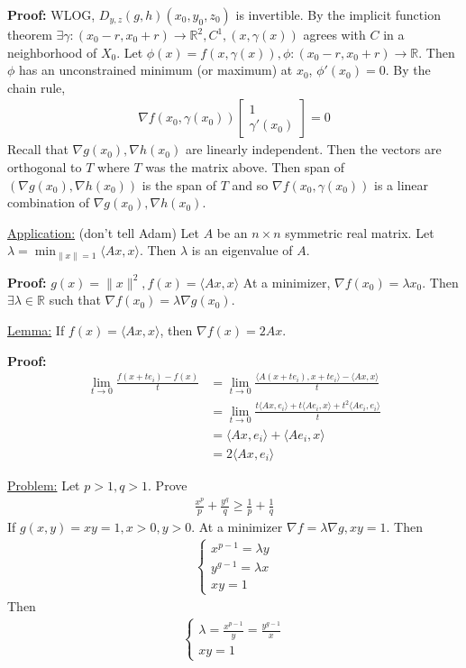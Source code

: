 \documentclass{article}
\newcommand*{\iprod}[1]{\langle #1 \rangle}
\newcommand*{\rr}{\mathbb{R}}%
\begin{document}
\textbf{Proof:} WLOG, $D_{y,z}(g,h)(x_0,y_0,z_0)$ is invertible. By the implicit function theorem $\exists \gamma:(x_0-r,x_0+r)\to \rr^2, C^1, (x,\gamma(x))$ agrees with $C$ in a neighborhood of $X_0$. Let $\phi(x)=f(x,\gamma(x)), \phi:(x_0-r,x_0+r)\to \rr$. Then $\phi$ has an unconstrained minimum (or maximum) at $x_0$, $\phi'(x_0)=0$. By the chain rule, \begin{align*}
    \nabla f(x_0,\gamma(x_0))\begin{bmatrix}
        1\\
        \gamma'(x_0)
    \end{bmatrix}=0
\end{align*}Recall that $\nabla g(x_0),\nabla h(x_0)$ are linearly independent. Then the vectors are orthogonal to $T$ where $T$ was the matrix above. Then span of $(\nabla g(x_0), \nabla h(x_0))$ is the span of $T$ and so $\nabla f(x_0,\gamma(x_0))$ is a linear combination of $\nabla g(x_0), \nabla h(x_0)$.

\underline{Application:} (don't tell Adam) Let $A$ be an $n\times n$ symmetric real matrix. Let $\lambda=\min_{\|x\|=1}\iprod{Ax,x}$. Then $\lambda$ is an eigenvalue of $A$.

\textbf{Proof:} $g(x)=\|x\|^2, f(x)=\iprod{Ax,x}$ At a minimizer, $\nabla f(x_0)=\lambda x_0$. Then $\exists \lambda\in \rr$ such that $\nabla f(x_0)=\lambda\nabla g(x_0)$.

\underline{Lemma:} If $f(x)=\iprod{Ax, x}$, then $\nabla f(x)=2Ax$.

\textbf{Proof:} \begin{align*}
    \lim_{t\to 0}\frac{f(x+te_i)-f(x)}{t}&=\lim_{t\to 0}\frac{\iprod{A(x+te_i),x+te_i}-\iprod{Ax,x}}{t}\\
    &=\lim_{t\to 0}\frac{t\iprod{Ax, e_i}+t\iprod{Ae_i,x}+t^2\iprod{Ae_i,e_i}}{t}\\
    &=\iprod{Ax,e_i}+\iprod{Ae_i,x}\\
    &=2\iprod{Ax,e_i}
\end{align*}

\underline{Problem:} Let $p>1, q>1$. Prove \begin{align*}
    \frac{x^p}{p}+\frac{y^q}{q}\geq \frac{1}{p}+\frac{1}{q}
\end{align*}If $g(x,y)=xy=1, x>0, y>0$. At a minimizer $\nabla f=\lambda\nabla g, xy=1$. Then \begin{align*}
    \begin{cases}
        x^{p-1}=\lambda y\\
        y^{g-1}=\lambda x\\
        xy = 1
    \end{cases}
\end{align*}Then \begin{align*}
    \begin{cases}
        \lambda=\frac{x^{p-1}}{y}=\frac{y^{g-1}}{x}\\
        xy = 1
    \end{cases}
\end{align*}
\end{document}
